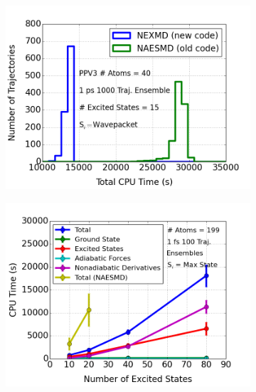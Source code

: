 \documentclass[letterpaper,12pt,titlepage]{article}
\begin{document}
\begin{appendix}
\begin{figure}[h]
\end{figure}
\begin{figure}[h]
	\centering 
	\begin{subfigure}[h]{0.425\textwidth}  
            \centering 
	    \includegraphics[scale=.35]{ppv_es_traj_decohere2_yestrivial_langevin_realistic_timings_hist.png}
        \end{subfigure}
	\hspace{3mm}
        \begin{subfigure}[h]{0.425\textwidth}   
            \centering 
            \includegraphics[scale=.35]
{timing_states_benchmark.png}
        \end{subfigure}
        \begin{subfigure}[h]{0.425\textwidth}   

\end{subfigure}
\end{figure}
\end{appendix}
\end{document}
